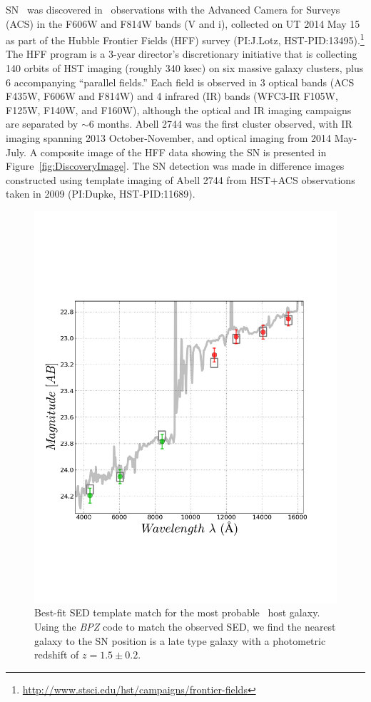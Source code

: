 SN \tomas\ was discovered in \HST\ observations with the Advanced
Camera for Surveys (ACS) in the F606W and F814W bands (V and i),
collected on UT 2014 May 15 as part of the Hubble Frontier Fields
(HFF) survey (PI:J.Lotz,
HST-PID:13495).\footnote{\url{http://www.stsci.edu/hst/campaigns/frontier-fields}}
The HFF program is a 3-year director's discretionary initiative that
is collecting 140 orbits of HST imaging (roughly 340 ksec) on six
massive galaxy clusters, plus 6 accompanying ``parallel fields.''
Each field is observed in 3 optical bands (ACS F435W, F606W and F814W)
and 4 infrared (IR) bands (WFC3-IR F105W, F125W, F140W, and F160W),
although the optical and IR imaging campaigns are separated by $\sim$6
months. Abell 2744 was the first cluster observed, with IR imaging
spanning 2013 October-November, and optical imaging from 2014
May-July.  A composite image of the HFF data showing the SN is
presented in Figure~\ref{fig:DiscoveryImage}.  The SN detection was
made in difference images constructed using template imaging of Abell
2744 from HST+ACS observations taken in 2009 (PI:Dupke,
HST-PID:11689).



\begin{figure}
\begin{center}
\includegraphics[width=\columnwidth]{FIG/host_sed_fit}
\caption{  \label{fig:HostSED}
Best-fit SED template match for the most probable \tomas\ host
galaxy. Using the {\it BPZ} code to match the observed SED, we find
the nearest galaxy to the SN position is a late type galaxy with a
photometric redshift of $z=1.5\pm0.2$.}
\end{center}
\end{figure}

